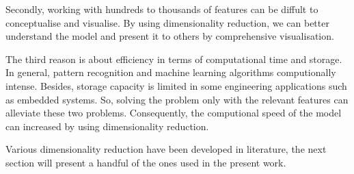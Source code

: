 Secondly, working with hundreds to thousands of features can be diffult to conceptualise and visualise. By using dimensionality reduction, we can better understand the model and present it to others by comprehensive visualisation.%

The third reason is about efficiency in terms of computational time and storage. In general, pattern recognition and machine learning algorithms computionally intense. Besides, storage capacity is limited in some engineering applications such as embedded systems. So, solving the problem only with the relevant features can alleviate these two problems. Consequently, the computional speed of the model can increased by using dimensionality reduction.

Various dimensionality reduction have been developed in literature, %
the next section will present a handful of the ones used in the present work. 


